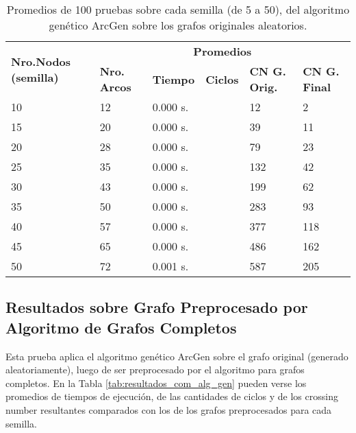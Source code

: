 \begin{table}[H]
	\caption{Promedios de 100 pruebas sobre cada semilla (de 5 a 50), del algoritmo genético ArcGen sobre los grafos originales aleatorios.}
	\label{tab:resultados_orig_alg_gen}
	\begin{tabularx}{\linewidth}{|X|X|p{1.5cm}|p{1.5cm}|X|X|}
		\hline
		\multirow{2}{2cm}{\textbf{Nro.Nodos (semilla)}} & \multicolumn{5}{c|}{\textbf{Promedios}} \\
		\cline{2-6}
		& \textbf{Nro. Arcos} & \textbf{Tiempo} & \textbf{Ciclos} & \textbf{CN G. Orig.} & \textbf{CN G. Final} \\
		\hline
		10 & 12 & 0.000 s. & & 12 & 2 \\
		\hline
		15 & 20 & 0.000 s. & & 39 & 11 \\
		\hline
		20 & 28 & 0.000 s. & & 79 & 23 \\
		\hline
		25 & 35 & 0.000 s. & & 132 & 42 \\
		\hline
		30 & 43 & 0.000 s. & & 199 & 62 \\
		\hline
		35 & 50 & 0.000 s. & & 283 & 93 \\
		\hline
		40 & 57 & 0.000 s. & & 377 & 118 \\
		\hline
		45 & 65 & 0.000 s. & & 486 & 162 \\
		\hline
		50 & 72 & 0.001 s. & & 587 & 205 \\
		\hline
	\end{tabularx}
\end{table}

\subsection{Resultados sobre Grafo Preprocesado por Algoritmo de Grafos Completos}
Esta prueba aplica el algoritmo genético ArcGen sobre el grafo original (generado aleatoriamente), luego de ser preprocesado por el algoritmo para grafos completos. En la Tabla \ref{tab:resultados_com_alg_gen} pueden verse los promedios de tiempos de ejecución, de las cantidades de ciclos y de los crossing number resultantes comparados con los de los grafos preprocesados para cada semilla.

